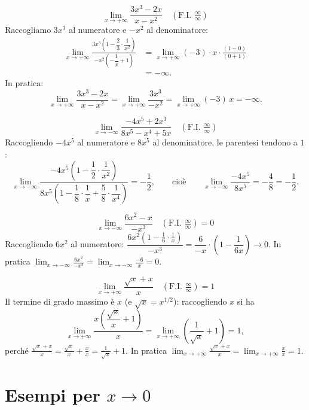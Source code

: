\documentclass[11pt,a4paper]{article}
\begin{document}
\begin{esempio}
\[
\lim_{x\to+\infty}\frac{3x^3 - 2x}{x - x^2} \quad (\text{F.I. } \tfrac{\infty}{\infty})
\]
Raccogliamo $3x^3$ al numeratore e $-x^2$ al denominatore:
\[
\begin{aligned}\lim_{x\to+\infty}\frac{3x^3\left(1 - \dfrac{2}{3}\cdot\dfrac{1}{x^2}\right)}{-x^2\left(-\dfrac{1}{x} + 1\right)}
&= \lim_{x\to+\infty}(-3)\cdot x\cdot\frac{(1 - 0)}{(0 + 1)} \\ &= -\infty .\end{aligned}
\]
In pratica:
\[
\lim_{x\to+\infty}\frac{3x^3 - 2x}{x - x^2} = \lim_{x\to+\infty}\frac{3x^3}{-x^2} = \lim_{x\to+\infty}(-3)\,x = -\infty .
\]
\end{esempio}

\begin{esempio}
\[
\lim_{x\to-\infty}\frac{-4x^5 + 2x^3}{8x^5 - x^4 + 5x} \quad (\text{F.I. } \tfrac{\infty}{\infty})
\]
Raccogliendo $-4x^5$ al numeratore e $8x^5$ al denominatore, le parentesi tendono a $1$:
\[
\lim_{x\to-\infty}\frac{-4x^5\left(1 - \dfrac{1}{2}\cdot\dfrac{1}{x^2}\right)}{8x^5\left(1 - \dfrac{1}{8}\cdot\dfrac{1}{x} + \dfrac{5}{8}\cdot\dfrac{1}{x^4}\right)} = -\frac{1}{2},
\qquad\text{cioè}\qquad
\lim_{x\to-\infty}\frac{-4x^5}{8x^5} = -\frac{4}{8} = -\frac{1}{2}.
\]
\end{esempio}

\begin{esempio}
\[
\lim_{x\to-\infty}\frac{6x^2 - x}{-x^3} \quad (\text{F.I. } \tfrac{\infty}{\infty}) = 0
\]
Raccogliendo $6x^2$ al numeratore: $\dfrac{6x^2\left(1 - \frac{1}{6}\cdot\frac{1}{x}\right)}{-x^3} = \dfrac{6}{-x}\cdot\left(1 - \dfrac{1}{6x}\right)\to 0$. In pratica $\displaystyle\lim_{x\to-\infty}\frac{6x^2}{-x^3} = \lim_{x\to-\infty}\frac{-6}{x} = 0$.
\end{esempio}

\begin{esempio}
\[
\lim_{x\to+\infty}\frac{\sqrt{x} + x}{x} \quad (\text{F.I. } \tfrac{\infty}{\infty}) = 1
\]
Il termine di grado massimo è $x$ (e $\sqrt x = x^{1/2}$): raccogliendo $x$ si ha
\[
\lim_{x\to+\infty}\frac{x\left(\dfrac{\sqrt{x}}{x} + 1\right)}{x} = \lim_{x\to+\infty}\left(\frac{1}{\sqrt{x}} + 1\right) = 1,
\]
perché $\frac{\sqrt{x} + x}{x} = \frac{\sqrt x}{x} + \frac{x}{x} = \frac{1}{\sqrt x} + 1$. In pratica $\displaystyle\lim_{x\to+\infty}\frac{\sqrt{x} + x}{x} = \lim_{x\to+\infty}\frac{x}{x} = 1$.
\end{esempio}

\section{Esempi per $x \to 0$}
\end{document}
